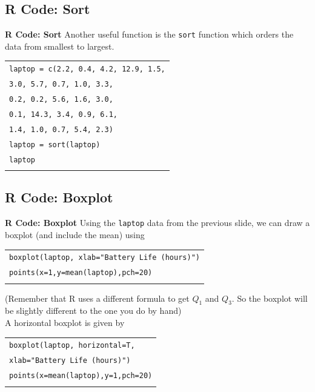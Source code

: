 \documentclass[compress]{beamer}        %
\makeatletter
\newcommand{\tcb}{\textcolor{beamer@blendedblue}}
\makeatother
\begin{document}
\subsection{R Code: Sort}
\begin{frame}{\bf \tcb{R Code: Sort}}
Another useful function is the \texttt{sort} function which orders the data from smallest to largest.\\[0.3cm]

\begin{tabular}{|l|}
\hline
\texttt{laptop = c(2.2, 0.4,  4.2, 12.9,  1.5,}\\
\hspace{2.5cm}\texttt{3.0,  5.7,  0.7,  1.0,  3.3,}\\
\hspace{2.5cm}\texttt{0.2,  0.2,  5.6,  1.6,  3.0,}\\
\hspace{2.5cm}\texttt{0.1, 14.3,  3.4,  0.9,  6.1,}\\
\hspace{2.5cm}\texttt{1.4,  1.0,  0.7,  5.4,  2.3)}\\
\texttt{laptop = sort(laptop)}\\
\texttt{laptop}\\
\hline
\multicolumn{1}{c}{}\\[-0.1cm]
\end{tabular}

\end{frame}



\subsection{R Code: Boxplot}
\begin{frame}{\bf \tcb{R Code: Boxplot}}
Using the \texttt{laptop} data from the previous slide, we can draw a boxplot (and include the mean) using\\[0.3cm]
\begin{tabular}{|l|}
\hline
\texttt{boxplot(laptop, xlab="Battery Life (hours)")}\\
\texttt{points(x=1,y=mean(laptop),pch=20)}\\
\hline
\multicolumn{1}{c}{}\\[-0.3cm]
\end{tabular}

{\footnotesize(Remember that R uses a different formula to get $Q_1$ and $Q_3$. So the boxplot will be slightly different to the one you do by hand)}\\[0.7cm]


A horizontal boxplot is given by\\[0.3cm]
\begin{tabular}{|l|}
\hline
\texttt{boxplot(laptop, horizontal=T, }\\
\hspace{2cm}\texttt{xlab="Battery Life (hours)")}\\
\texttt{points(x=mean(laptop),y=1,pch=20)}\\
\hline
\multicolumn{1}{c}{}\\[-0.1cm]
\end{tabular}
\end{frame}
\end{document}
